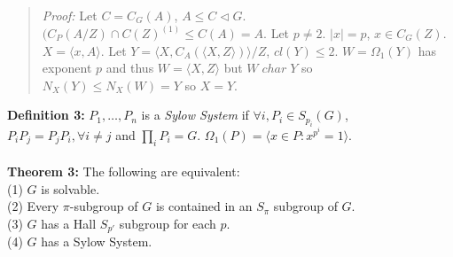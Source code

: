 \begin{quote}
\emph{Proof:}  
Let $C= C_G(A)$, $A \le C \lhd G$.  $(C_P(A/Z) \cap C(Z)^{(1)} \le C(A)=A$.  Let 
$p \ne 2$.  $|x|=p$, $x \in C_G(Z)$.  $X= \langle x, A \rangle $.  Let 
$Y= \langle X, C_A( \langle X,Z \rangle) \rangle /Z$,
$cl(Y) \le 2$.  $W= \Omega_1(Y)$ has exponent $p$ and thus $W= \langle X, Z \rangle $ but
$W \; char \; Y$ so $N_X(Y) \le N_X(W)= Y$ so $X=Y$.
\end{quote}
{\bf Definition 3:} 
$P_1, \ldots , P_n$ is a \emph{Sylow System} if $\forall i, P_i \in S_{p_i}(G)$,
$P_i P_j = P_j P_i, \forall i \ne j$ and $\prod_i P_i = G$.  
$\Omega_1(P)= \langle x \in P: x^{p^i}=1 \rangle $.
\\
\\
{\bf Theorem 3:}
The following are equivalent:\\
(1) $G$ is solvable.\\
(2) Every $\pi$-subgroup of $G$ is contained in an $S_{\pi}$ subgroup of $G$.\\
(3) $G$ has a Hall $S_{p'}$ subgroup for each $p$.\\
(4) $G$ has a Sylow System.
